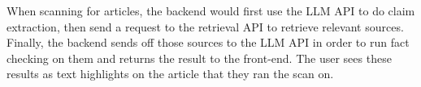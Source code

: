 When scanning for articles, the backend would first use the LLM API to do claim extraction, then send a request to the retrieval API to retrieve relevant sources. Finally, the backend sends off those sources to the LLM API in order to run fact checking on them and returns the result to the front-end. The user sees these results as text highlights on the article that they ran the scan on.
